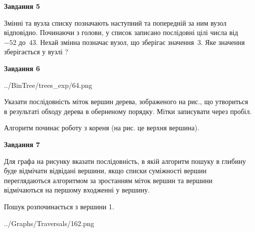 \documentclass[12pt, ukrainian]{article}
\begin{document}
{\begin {large}
{\begin {center}\textbf{Завдання 5}\end {center}}\par
Змінні  та  вузла списку позначають наступний та попередній за ним вузол відповідно. Починаючи з голови, у список записано послідовні цілі числа від~$-52$ до~$43$. Нехай змінна  позначає вузол, що зберігає значення~$3$.
Яке значення зберігається у вузлі  ?\par
\newpage

{\begin {center}\textbf{Завдання 6}\end {center}}\par

\begin{center}
	{../BinTree/trees_exp/64.png}
\end{center}
Указати послідовність міток вершин дерева, зображеного на рис., що утвориться в результаті обходу дерева в оберненому порядку. Мітки записувати через пробіл.\par Алгоритм починає роботу з кореня (на рис. це верхня вершина).\par
\newpage

{\begin {center}\textbf{Завдання 7}\end {center}}\par
Для графа на рисунку вказати послідовність, в якій алгоритм пошуку в глибину буде відмічати відвідані вершини, якщо списки суміжності вершин переглядаються алгоритмом за зростанням міток вершин та вершини відмічаються на першому вход\-женні у вершину.\par
Пошук розпочинається з вершини 1.\par

\begin{center}
	{../Graphs/Traversals/162.png}
\end{center}\par
\newpage


\end{large}}
\end{document}
